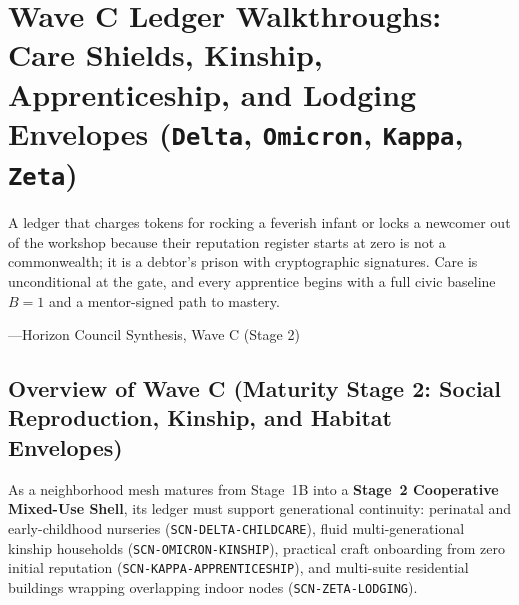 \chapter{Wave C Ledger Walkthroughs: Care Shields, Kinship, Apprenticeship, and Lodging Envelopes (\texttt{Delta}, \texttt{Omicron}, \texttt{Kappa}, \texttt{Zeta})}
\label{ch:wave-c-walkthroughs}

\epigraph{A ledger that charges tokens for rocking a feverish infant or locks a newcomer out of the workshop because their reputation register starts at zero is not a commonwealth; it is a debtor's prison with cryptographic signatures. Care is unconditional at the gate, and every apprentice begins with a full civic baseline $B = 1$ and a mentor-signed path to mastery.}{---Horizon Council Synthesis, Wave C (Stage 2)}

\section{Overview of Wave C (Maturity Stage 2: Social Reproduction, Kinship, and Habitat Envelopes)}
\label{sec:ch11-overview}

As a neighborhood mesh matures from Stage~1B into a \textbf{Stage~2 Cooperative Mixed-Use Shell}, its ledger must support generational continuity: perinatal and early-childhood nurseries (\texttt{SCN-DELTA-CHILDCARE}), fluid multi-generational kinship households (\texttt{SCN-OMICRON-KINSHIP}), practical craft onboarding from zero initial reputation (\texttt{SCN-KAPPA-APPRENTICESHIP}), and multi-suite residential buildings wrapping overlapping indoor nodes (\texttt{SCN-ZETA-LODGING}).

